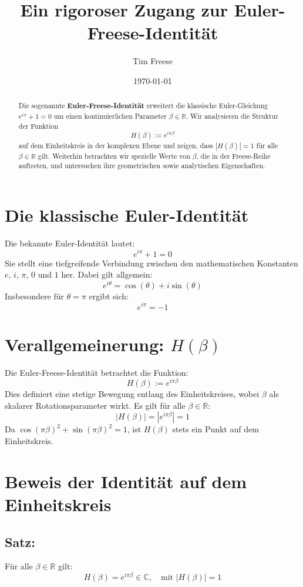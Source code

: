 \documentclass[12pt]{article}
\title{Ein rigoroser Zugang zur Euler-Freese-Identität}
\author{Tim Freese}
\date{\today}
\begin{document}
\maketitle

\begin{abstract}
Die sogenannte \textbf{Euler-Freese-Identität} erweitert die klassische Euler-Gleichung $e^{i\pi} + 1 = 0$ um einen kontinuierlichen Parameter $\beta \in \mathbb{R}$. Wir analysieren die Struktur der Funktion
\[
H(\beta) := e^{i \pi \beta}
\]
auf dem Einheitskreis in der komplexen Ebene und zeigen, dass $|H(\beta)| = 1$ für alle $\beta \in \mathbb{R}$ gilt. Weiterhin betrachten wir spezielle Werte von $\beta$, die in der Freese-Reihe auftreten, und untersuchen ihre geometrischen sowie analytischen Eigenschaften.
\end{abstract}

\section{Die klassische Euler-Identität}

Die bekannte Euler-Identität lautet:
\[
e^{i \pi} + 1 = 0
\]
Sie stellt eine tiefgreifende Verbindung zwischen den mathematischen Konstanten $e$, $i$, $\pi$, $0$ und $1$ her. Dabei gilt allgemein:
\[
e^{i \theta} = \cos(\theta) + i \sin(\theta)
\]
Insbesondere für $\theta = \pi$ ergibt sich:
\[
e^{i\pi} = -1
\]

\section{Verallgemeinerung: \texorpdfstring{$H(\beta)$}{H(beta)}}

Die Euler-Freese-Identität betrachtet die Funktion:
\[
H(\beta) := e^{i\pi \beta}
\]
Dies definiert eine stetige Bewegung entlang des Einheitskreises, wobei $\beta$ als skalarer Rotationsparameter wirkt. Es gilt für alle $\beta \in \mathbb{R}$:
\[
|H(\beta)| = |e^{i\pi\beta}| = 1
\]
Da $\cos(\pi \beta)^2 + \sin(\pi \beta)^2 = 1$, ist $H(\beta)$ stets ein Punkt auf dem Einheitskreis.

\section{Beweis der Identität auf dem Einheitskreis}

\subsection*{Satz:}
Für alle $\beta \in \mathbb{R}$ gilt:
\[
H(\beta) = e^{i\pi\beta} \in \mathbb{C}, \quad \text{mit } |H(\beta)| = 1
\]
\end{document}
